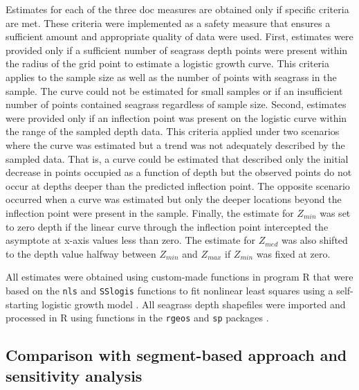 \documentclass[letterpaper,12pt,oneside]{article}\usepackage[]{graphicx}\usepackage[]{color}
\begin{document}
Estimates for each of the three \ac{doc} measures are obtained only if specific criteria are met.  These criteria were implemented as a safety measure that ensures a sufficient amount and appropriate quality of data were used.  First, estimates were provided only if a sufficient number of seagrass depth points were present within the radius of the grid point to estimate a logistic growth curve.  This criteria applies to the sample size as well as the number of points with seagrass in the sample.  The curve could not be estimated for small samples or if an insufficient number of points contained seagrass regardless of sample size.  Second, estimates were provided only if an inflection point was present on the logistic curve within the range of the sampled depth data.  This criteria applied under two scenarios where the curve was estimated but a trend was not adequately described by the sampled data.  That is, a curve could be estimated that described only the initial decrease in points occupied as a function of depth but the observed points do not occur at depths deeper than the predicted inflection point.  The opposite scenario occurred when a curve was estimated but only the deeper locations beyond the inflection point were present in the sample.  Finally, the estimate for $Z_{min}$ was set to zero depth if the linear curve through the inflection point intercepted the asymptote at x-axis values less than zero.  The estimate for $Z_{med}$ was also shifted to the depth value halfway between $Z_{min}$ and $Z_{max}$ if $Z_{min}$ was fixed at zero.  

All estimates were obtained using custom-made functions in program R that were based on the \texttt{nls} and \texttt{SSlogis} functions to fit nonlinear least squares using a self-starting logistic growth model \citep{Bates92,RDCT14}.  All seagrass depth shapefiles were imported and processed in R using functions in the \texttt{rgeos} and \texttt{sp} packages \citep{Bivand08,Bivand14}.  

\subsection{Comparison with segment-based approach and sensitivity analysis}
\end{document}
